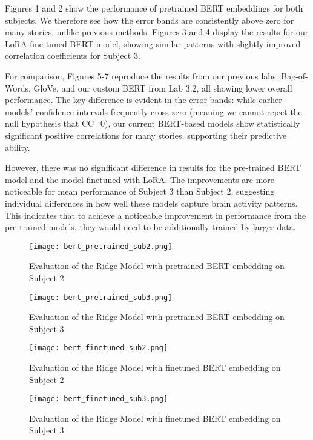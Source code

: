 \documentclass[12pt,letterpaper]{article}
\begin{document}
Figures 1 and 2 show the performance of pretrained BERT embeddings for both subjects. We therefore see how the error bands are consistently above zero for many stories, unlike previous methods. Figures 3 and 4 display the results for our LoRA fine-tuned BERT model, showing similar patterns with slightly improved correlation coefficients for Subject 3.

For comparison, Figures 5-7 reproduce the results from our previous labs: Bag-of-Words, GloVe, and our custom BERT from Lab 3.2, all showing lower overall performance. The key difference is evident in the error bands: while earlier models' confidence intervals frequently cross zero (meaning we cannot reject the null hypothesis that CC=0), our current BERT-based models show statistically significant positive correlations for many stories, supporting their predictive ability.

However, there was no significant difference in results for the pre-trained BERT model and the model finetuned with LoRA. The improvements are more noticeable for mean performance of Subject 3 than Subject 2, suggesting individual differences in how well these models capture brain activity patterns. This indicates that to achieve a noticeable improvement in performance from the pre-trained models, they would need to be additionally trained by larger data.

\begin{figure}[H]
  \centering
  \texttt{[image: bert\_pretrained\_sub2.png]}
  \caption{Evaluation of the Ridge Model with pretrained BERT embedding on Subject 2}
  \label{fig:evaluation_ridge_bert_pretrained_subject2}
\end{figure}

\begin{figure}[H]
  \centering
  \texttt{[image: bert\_pretrained\_sub3.png]}
  \caption{Evaluation of the Ridge Model with pretrained BERT embedding on Subject 3}
  \label{fig:evaluation_ridge_bert_pretrained_subject2}
\end{figure}

\begin{figure}[H]
  \centering
  \texttt{[image: bert\_finetuned\_sub2.png]}
  \caption{Evaluation of the Ridge Model with finetuned BERT embedding on Subject 2}
  \label{fig:evaluation_ridge_bert_pretrained_subject2}
\end{figure}

\begin{figure}[H]
  \centering
  \texttt{[image: bert\_finetuned\_sub3.png]}
  \caption{Evaluation of the Ridge Model with finetuned BERT embedding on Subject 3}
  \label{fig:evaluation_ridge_bert_pretrained_subject2}
\end{figure}
\end{document}
